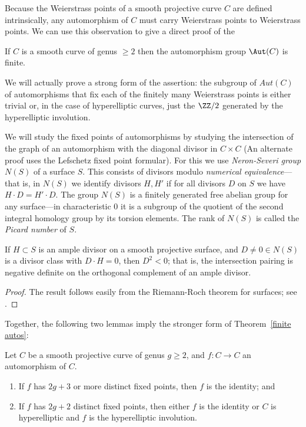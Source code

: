 Because the Weierstrass points of a smooth projective curve $C$ are defined intrinsically, any automorphism of $C$ must carry Weierstrass points to Weierstrass points. We can use this observation to give a direct proof of the

\begin{theorem}\label{finite autos}
If $C$ is a smooth curve of genus $\geq 2$ then the automorphism group $\Aut(C)$ is finite.
\end{theorem}

We will actually prove a strong form of the assertion: the subgroup of $Aut(C)$ of automorphisms that fix each  of the finitely many Weierstrass points is either
 trivial or, in the case of hyperelliptic curves, just the $\ZZ/2$ generated by the hyperelliptic involution.
    
We will study the fixed points of automorphisms by studying the intersection of the graph of
an automorphism with the diagonal divisor in $C\times C$ (An alternate proof uses the Lefschetz fixed point formular). For this we use
\emph{Neron-Severi group} $N(S)$ of a surface $S$. This consists of divisors modulo \emph{numerical equivalence}---that is, in $N(S)$ we identify divisors $H, H'$ if for all divisors $D$ on $S$ we have $H\cdot D = H'\cdot D$. The group
$N(S)$ is a  finitely generated free abelian group for any surface---in characteristic 0 it is a subgroup of the quotient of the second integral homology group by its torsion elements. The rank of $N(S)$ is called the \emph{Picard number} of $S$. 

\begin{theorem}\label{hodge index}
If $H\subset S$ is an ample divisor on a smooth projective surface, and $D \neq 0 \in N(S)$ is a divisor class with $D\cdot H = 0$, then 
$D^2<0$; that is, the intersection pairing is negative definite on the orthogonal complement of an
ample divisor.
\end{theorem}
\begin{proof}
The result follows easily from the Riemann-Roch theorem for surfaces; see \cite[Theorem V.1.9]{Hartshorne1977}.
\end{proof}

Together, the following two lemmas imply the stronger form of Theorem~\ref{finite autos}:

\begin{lemma}Let $C$ be a smooth projective curve of genus $g \geq 2$, and $f: C \to C$ an automorphism of $C$.
\begin{enumerate}
\item If $f$ has $2g+3$ or more distinct fixed points, then $f$ is the identity; and
\item If $f$ has $2g+2$ distinct fixed points, then either $f$ is the identity or $C$ is hyperelliptic and $f$ is the hyperelliptic involution.
\end{enumerate}
\end{lemma}

